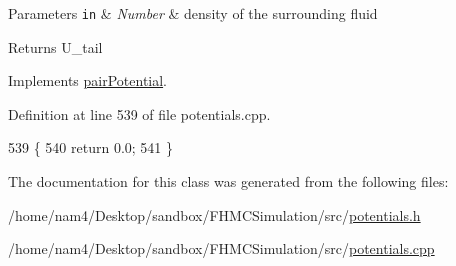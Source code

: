 \begin{DoxyParams}[1]{Parameters}
\mbox{\tt in}  & {\em Number} & density of the surrounding fluid\\
\hline
\end{DoxyParams}
\begin{DoxyReturn}{Returns}
U\-\_\-tail 
\end{DoxyReturn}


Implements \hyperlink{classpair_potential_a5387d21d8d487d1d42e9eaf7cae9175b}{pair\-Potential}.



Definition at line 539 of file potentials.\-cpp.


\begin{DoxyCode}
539                                                       \{
540     \textcolor{keywordflow}{return} 0.0;
541 \}
\end{DoxyCode}


The documentation for this class was generated from the following files\-:\begin{DoxyCompactItemize}
\item 
/home/nam4/\-Desktop/sandbox/\-F\-H\-M\-C\-Simulation/src/\hyperlink{potentials_8h}{potentials.\-h}\item 
/home/nam4/\-Desktop/sandbox/\-F\-H\-M\-C\-Simulation/src/\hyperlink{potentials_8cpp}{potentials.\-cpp}\end{DoxyCompactItemize}
